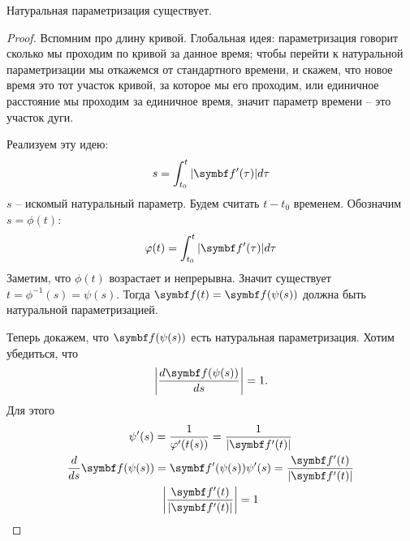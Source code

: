 \documentclass[main]{subfiles}
\begin{document}
\begin{theorem}
    Натуральная параметризация существует.
\end{theorem}
\begin{proof}
    Вспомним про длину кривой.
    Глобальная идея: параметризация говорит сколько мы проходим по кривой за данное время;
    чтобы перейти к натуральной параметризации мы откажемся от стандартного времени,
    и скажем, что новое время это тот участок кривой, за которое мы его проходим, или
    единичное расстояние мы проходим за единичное время, значит параметр времени -- это участок дуги.

    Реализуем эту идею:
    \[s = \int_{t_0}^t |\vf'(\tau)| d\tau\]
    $s$ -- искомый натуральный параметр.
    Будем считать $t - t_0$ временем.
    Обозначим $s = \phi(t)$:
    \[\phi(t) = \int_{t_0}^t |\vf'(\tau)| d\tau\]
    Заметим, что $\phi(t)$ возрастает и непрерывна.
    Значит существует $t = \phi^{-1}(s)  = \psi(s)$.
    Тогда $\vf(t) = \vf(\psi(s))$ должна быть натуральной параметризацией.

    Теперь докажем, что $\vf(\psi(s))$ есть натуральная параметризация.
    Хотим убедиться, что
    \[\left| \frac{d \vf(\psi(s))}{ds}\right| = 1.\]
    Для этого
    \begin{gather*}
        \psi'(s) = \frac{1}{\phi'(t(s))} = \frac{1}{|\vf'(t)|}\\
        \frac{d}{ds}\vf(\psi(s)) = \vf'(\psi(s)) \psi'(s) = \frac{\vf'(t)}{|\vf'(t)|}\\
        \left| \frac{\vf'(t)}{|\vf'(t)|} \right| = 1
    \end{gather*}
\end{proof}
\end{document}
